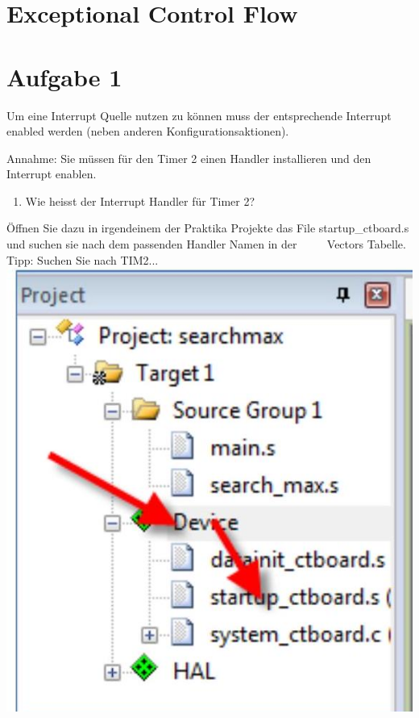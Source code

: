 \section*{Exceptional Control Flow}
\section*{Aufgabe 1}
Um eine Interrupt Quelle nutzen zu können muss der entsprechende Interrupt enabled werden (neben anderen Konfigurationsaktionen).

Annahme: Sie müssen für den Timer 2 einen Handler installieren und den Interrupt enablen.

\begin{enumerate}
  \item Wie heisst der Interrupt Handler für Timer 2?
\end{enumerate}

Öffnen Sie dazu in irgendeinem der Praktika Projekte das File startup\_ctboard.s und suchen sie nach dem passenden Handler Namen in der $\qquad$ Vectors Tabelle.\\
Tipp: Suchen Sie nach TIM2...\\
\includegraphics[width=\linewidth]{images/2025_01_02_1e89fec346403e1ae751g-1}

